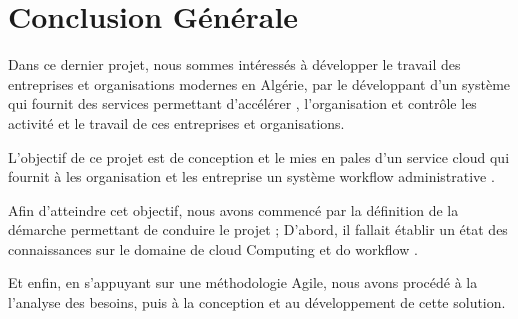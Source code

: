 \chapter*{Conclusion Générale }

Dans ce dernier projet, nous sommes intéressés à développer le travail des entreprises et organisations modernes en Algérie,
par le développant d'un système qui fournit des services permettant d’accélérer , l’organisation et contrôle  les activité  et le travail de ces   entreprises et organisations.



L’objectif de ce projet est de conception et le mies en pales d'un  service cloud qui fournit à les organisation et les entreprise un  système workflow administrative .   


 

  
Afin d’atteindre cet objectif, nous avons commencé par la définition de la démarche permettant de conduire le projet ; D’abord, il fallait établir un état des connaissances sur le domaine de cloud Computing  et do workflow .  




 Et enfin, en s’appuyant sur une méthodologie Agile, nous avons procédé à la l’analyse des besoins, puis à la conception et au développement de cette solution. 